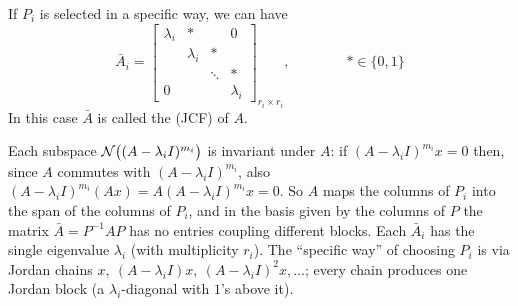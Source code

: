 \point If $P_i$ is selected in a specific way, we can have
\[
\bar A_i=\begin{bmatrix}\lambda_i & \ast & & 0\\ & \lambda_i & \ast & \\ & & \ddots & \ast\\ 0 & & & \lambda_i\end{bmatrix}_{r_i\times r_i},
\qquad\qquad \ast\in\{0,1\}
\]
In this case $\bar A$ is called the  (JCF) of $A$.
\begin{insight}
Each subspace $\mathcal{N}\big((A-\lambda_iI)^{m_i}\big)$ is invariant under $A$: if $(A-\lambda_iI)^{m_i}x=0$ then, since $A$ commutes with $(A-\lambda_iI)^{m_i}$, also $(A-\lambda_iI)^{m_i}(Ax)=A(A-\lambda_iI)^{m_i}x=0$. So $A$ maps the columns of $P_i$ into the span of the columns of $P_i$, and in the basis given by the columns of $P$ the matrix $\bar A=P^{-1}AP$ has no entries coupling different blocks. Each $\bar A_i$ has the single eigenvalue $\lambda_i$ (with multiplicity $r_i$). The ``specific way'' of choosing $P_i$ is via Jordan chains $x,\ (A-\lambda_iI)x,\ (A-\lambda_iI)^2x,\dots$; every chain produces one Jordan block (a $\lambda_i$-diagonal with $1$'s above it).
\end{insight}

